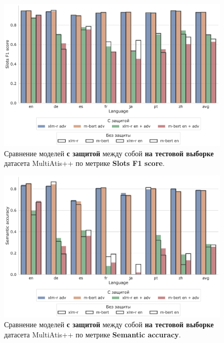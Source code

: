 \begin{figure}[H]
    \centering
    \includegraphics[width=\textwidth]{images/10}
    \caption{Сравнение моделей \textbf{с защитой} между собой \textbf{на тестовой выборке} датасета MultiAtis++ по метрике \textbf{Slots F1 score}.}\label{fig:figure10}
\end{figure}
\begin{figure}[H]
    \centering
    \includegraphics[width=\textwidth]{images/11}
    \caption{Сравнение моделей \textbf{с защитой} между собой \textbf{на тестовой выборке} датасета MultiAtis++ по метрике \textbf{Semantic accuracy}.}\label{fig:figure11}
\end{figure}

